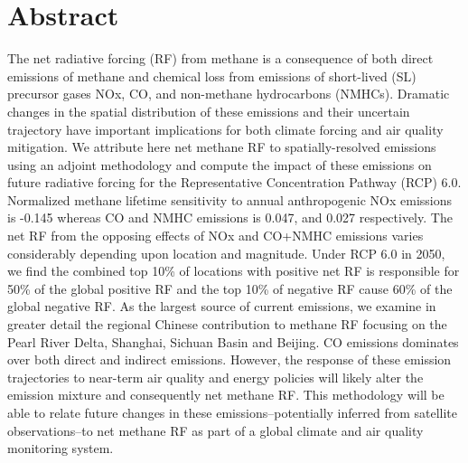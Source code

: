 \section*{Abstract}

The net radiative forcing (RF) from methane is a consequence of both direct emissions of methane and chemical loss from emissions of short-lived (SL) precursor gases NOx, CO, and non-methane hydrocarbons (NMHCs). Dramatic changes in the spatial distribution of these emissions and their uncertain trajectory have important implications for both climate forcing and air quality mitigation.  We attribute here net methane RF  to spatially-resolved emissions using an adjoint methodology and compute the impact of these emissions on future radiative forcing for the Representative Concentration Pathway (RCP) 6.0.  Normalized methane lifetime sensitivity  to annual anthropogenic NOx emissions is -0.145 whereas  CO and NMHC emissions is 0.047, and 0.027 respectively. The net RF from the opposing effects of NOx and CO+NMHC emissions varies considerably depending upon location and magnitude.  Under RCP 6.0 in 2050,  we find the combined top 10\% of locations with positive net RF is responsible for 50\% of the global positive RF and the top 10\% of negative RF  cause 60\% of the global negative RF. As the largest source of current emissions, we examine in greater detail the regional Chinese contribution to methane RF focusing on the Pearl River Delta, Shanghai, Sichuan Basin and Beijing.  CO emissions dominates over both direct and indirect emissions. However, the response of these emission trajectories to near-term air quality and energy policies will likely alter the emission mixture and consequently net methane RF. This methodology will be able to relate future changes in these emissions--potentially inferred from satellite observations--to net methane RF  as part of a global climate and air quality monitoring system. 